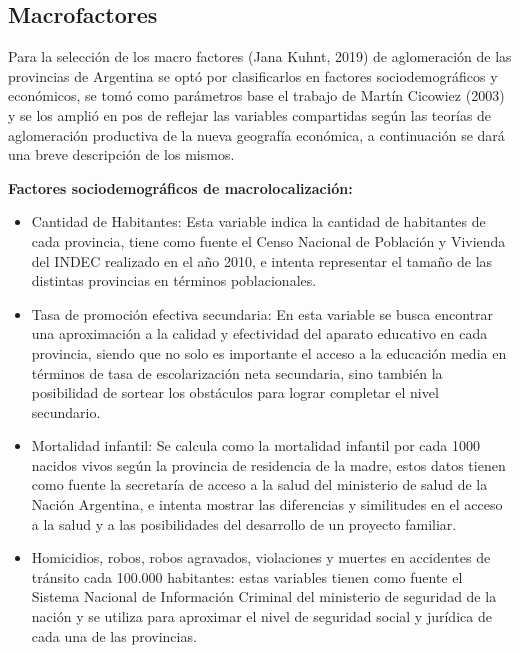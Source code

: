 \documentclass[12pt,a4paper]{article}
\begin{document}
\subsection{Macrofactores}

 Para la selección de los macro factores (Jana Kuhnt, 2019) de aglomeración de las provincias de Argentina se optó por clasificarlos en factores sociodemográficos y económicos, se tomó como parámetros base el trabajo de Martín Cicowiez (2003) y se los amplió en pos de reflejar las variables compartidas según las teorías de aglomeración productiva de la nueva geografía económica, a continuación se dará una breve descripción de los mismos.

\textbf{Factores sociodemográficos de macrolocalización:}
\begin{itemize}
\item Cantidad de Habitantes: Esta variable indica la cantidad de habitantes de cada provincia, tiene como fuente el Censo Nacional de Población y Vivienda del INDEC realizado en el año 2010, e intenta representar el tamaño de las distintas provincias en términos poblacionales.

\item Tasa de promoción efectiva secundaria: En esta variable se busca encontrar una aproximación a la calidad y efectividad del aparato educativo en cada provincia, siendo que no solo es importante el acceso a la educación media en términos de tasa de escolarización neta secundaria, sino también la posibilidad de sortear los obstáculos para lograr completar el nivel secundario.

\item Mortalidad infantil: Se calcula como la mortalidad infantil por cada 1000 nacidos vivos según la provincia de residencia de la madre, estos datos tienen como fuente la secretaría de acceso a la salud del ministerio de salud de la Nación Argentina, e intenta mostrar las diferencias y similitudes en el acceso a la salud y a las posibilidades del desarrollo de un proyecto familiar.

\item Homicidios, robos, robos agravados, violaciones y muertes en accidentes de tránsito cada 100.000 habitantes: estas variables tienen como fuente el Sistema Nacional de Información Criminal del ministerio de seguridad de la nación y se utiliza para aproximar el nivel de seguridad social y jurídica de cada una de las provincias.
\end{itemize}
\end{document}
